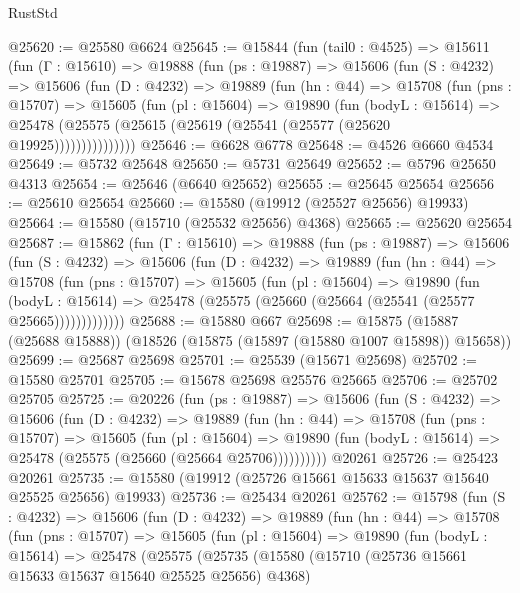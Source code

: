 \begin{lexlean}{RustStd}
\begin{coremodule}
@25620 := @25580 @6624
@25645 := @15844
    (fun (tail0 : @4525) =>
    @15611
      (fun (Γ : @15610) =>
      @19888
        (fun (ps : @19887) =>
        @15606
          (fun (S : @4232) =>
          @15606
            (fun (D : @4232) =>
            @19889
              (fun (hn : @44) =>
              @15708
                (fun (pns : @15707) =>
                @15605
                  (fun (pl : @15604) =>
                  @19890
                    (fun (bodyL : @15614) =>
                    @25478 (@25575 (@25615 (@25619 (@25541 (@25577 (@25620 @19925)))))))))))))))
@25646 := @6628 @6778
@25648 := @4526 @6660 @4534
@25649 := @5732 @25648
@25650 := @5731 @25649
@25652 := @5796 @25650 @4313
@25654 := @25646 (@6640 @25652)
@25655 := @25645 @25654
@25656 := @25610 @25654
@25660 := @15580 (@19912 (@25527 @25656) @19933)
@25664 := @15580 (@15710 (@25532 @25656) @4368)
@25665 := @25620 @25654
@25687 := @15862
    (fun (Γ : @15610) =>
    @19888
      (fun (ps : @19887) =>
      @15606
        (fun (S : @4232) =>
        @15606
          (fun (D : @4232) =>
          @19889
            (fun (hn : @44) =>
            @15708
              (fun (pns : @15707) =>
              @15605
                (fun (pl : @15604) =>
                @19890
                  (fun (bodyL : @15614) =>
                  @25478 (@25575 (@25660 (@25664 (@25541 (@25577 @25665)))))))))))))
@25688 := @15880 @667
@25698 := @15875 (@15887 (@25688 @15888)) (@18526 (@15875 (@15897 (@15880 @1007 @15898)) @15658))
@25699 := @25687 @25698
@25701 := @25539 (@15671 @25698)
@25702 := @15580 @25701
@25705 := @15678 @25698 @25576 @25665
@25706 := @25702 @25705
@25725 := @20226
    (fun (ps : @19887) =>
    @15606
      (fun (S : @4232) =>
      @15606
        (fun (D : @4232) =>
        @19889
          (fun (hn : @44) =>
          @15708
            (fun (pns : @15707) =>
            @15605
              (fun (pl : @15604) =>
              @19890 (fun (bodyL : @15614) => @25478 (@25575 (@25660 (@25664 @25706))))))))))
    @20261
@25726 := @25423 @20261
@25735 := @15580 (@19912 (@25726 @15661 @15633 @15637 @15640 @25525 @25656) @19933)
@25736 := @25434 @20261
@25762 := @15798
    (fun (S : @4232) =>
    @15606
      (fun (D : @4232) =>
      @19889
        (fun (hn : @44) =>
        @15708
          (fun (pns : @15707) =>
          @15605
            (fun (pl : @15604) =>
            @19890
              (fun (bodyL : @15614) =>
              @25478
                (@25575
                  (@25735
                    (@15580
                      (@15710 (@25736 @15661 @15633 @15637 @15640 @25525 @25656) @4368)

\end{coremodule}
\end{lexlean}

